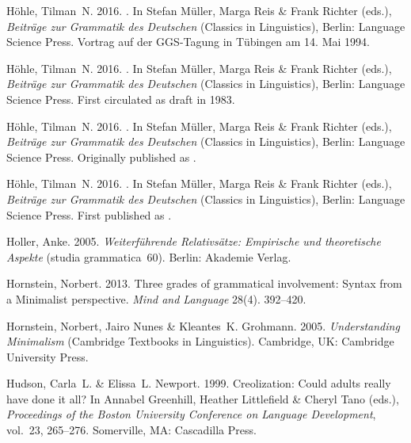 \begin{thebibliography}{1420}
H{\"o}hle, Tilman~N. 2016{}.
.
\newblock In Stefan M{\"u}ller, Marga Reis \& Frank Richter (eds.),
  \emph{{Beitr{\"a}ge zur Grammatik des Deutschen}}  (Classics in Linguistics),
  Berlin: Language Science Press.
\newblock Vortrag auf der GGS-Tagung in T{\"u}bingen am 14. Mai 1994.

H{\"o}hle, Tilman~N. 2016{}.
.
\newblock In Stefan M{\"u}ller, Marga Reis \& Frank Richter (eds.),
  \emph{{Beitr{\"a}ge zur Grammatik des Deutschen}}  (Classics in Linguistics),
  Berlin: Language Science Press.
\newblock First circulated as draft in 1983.

H{\"o}hle, Tilman~N. 2016{}.
.
\newblock In Stefan M{\"u}ller, Marga Reis \& Frank Richter (eds.),
  \emph{{Beitr{\"a}ge zur Grammatik des Deutschen}}  (Classics in Linguistics),
  Berlin: Language Science Press.
\newblock Originally published as .

H{\"o}hle, Tilman~N. 2016{}.
.
\newblock In Stefan M{\"u}ller, Marga Reis \& Frank Richter (eds.),
  \emph{{Beitr{\"a}ge zur Grammatik des Deutschen}}  (Classics in Linguistics),
  Berlin: Language Science Press.
\newblock First published as .

Holler, Anke. 2005.
\newblock \emph{{Weiterf{\"u}hrende Relativs{\"a}tze: Empirische und
  theoretische Aspekte}} (studia grammatica~60).
\newblock Berlin: Akademie Verlag.

Hornstein, Norbert. 2013.
\newblock Three grades of grammatical involvement: {Syntax} from a {Minimalist}
  perspective.
\newblock \emph{Mind and Language} 28(4). 392--420.

Hornstein, Norbert, Jairo Nunes \& Kleantes~K. Grohmann. 2005.
\newblock \emph{Understanding {Minimalism}}  (Cambridge Textbooks in
  Linguistics).
\newblock Cambridge, UK: Cambridge University Press.

Hudson, Carla~L. \& Elissa~L. Newport. 1999.
\newblock Creolization: Could adults really have done it all?
\newblock In Annabel Greenhill, Heather Littlefield \& Cheryl Tano (eds.),
  \emph{Proceedings of the {Boston University Conference on Language
  Development}}, vol.~23, 265--276. Somerville, MA: Cascadilla Press.


\end{thebibliography}

